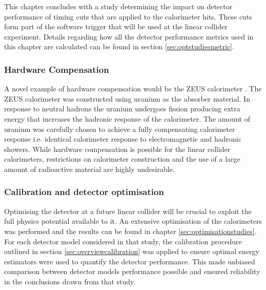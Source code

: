 This chapter concludes with a study determining the impact on detector performance of timing cuts that are applied to the calorimeter hits.  These cuts form part of the software trigger that will be used at the linear collider experiment.  Details regarding how all the detector performance metrics used in this chapter are calculated can be found in section \ref{sec:optstudiesmetric}.


\subsubsection{Hardware Compensation}
A novel example of hardware compensation would be the ZEUS calorimeter \cite{Derrick:1991tq}.  The ZEUS calorimeter was constructed using uranium as the absorber material.  In response to neutral hadrons the uranium undergoes fission producing extra energy that increases the hadronic response of the calorimeter.  The amount of uranium was carefully chosen to achieve a fully compensating calorimeter response i.e. identical calorimeter response to electromagnetic and hadronic showers.  While hardware compensation is possible for the linear collider calorimeters, restrictions on calorimeter construction and the use of a large amount of radioactive material are highly undesirable.  


\subsubsection{Calibration and detector optimisation}
Optimising the detector at a future linear collider will be crucial to exploit the full physics potential available to it.  An extensive optimisation of the calorimeters was performed and the results can be found in chapter \ref{sec:optimisationstudies}.  For each detector model considered in that study, the calibration procedure outlined in section \ref{sec:overviewcalibration} was applied to ensure optimal energy estimators were used to quantify the detector performance.  This made unbiased comparison between detector models performance possible and ensured reliability in the conclusions drawn from that study.


